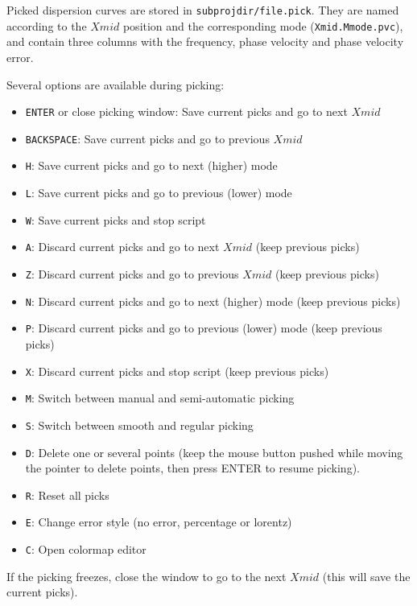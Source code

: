 \documentclass[twoside,a4paper]{article}
\begin{document}
Picked dispersion curves are stored in \verb|subprojdir/file.pick|. They are named according to the $Xmid$ position and the corresponding mode (\verb|Xmid.Mmode.pvc|), and contain three columns with the frequency, phase velocity and phase velocity error.

Several options are available during picking:
\begin{itemize}[leftmargin=*]
\item \verb|ENTER| or close picking window: Save current picks and go to next $Xmid$
\item \verb|BACKSPACE|: Save current picks and go to previous $Xmid$
\item \verb|H|: Save current picks and go to next (higher) mode
\item \verb|L|: Save current picks and go to previous (lower) mode
\item \verb|W|: Save current picks and stop script
\item \verb|A|: Discard current picks and go to next $Xmid$  (keep previous picks)
\item \verb|Z|: Discard current picks and go to previous $Xmid$ (keep previous picks)
\item \verb|N|: Discard current picks and go to next (higher) mode (keep previous picks)
\item \verb|P|: Discard current picks and go to previous (lower) mode (keep previous picks)
\item \verb|X|: Discard current picks and stop script (keep previous picks)
\item \verb|M|: Switch between manual and semi-automatic picking
\item \verb|S|: Switch between smooth and regular picking
\item \verb|D|: Delete one or several points (keep the mouse button pushed while moving the pointer to delete points, then press ENTER to resume picking).
\item \verb|R|: Reset all picks
\item \verb|E|: Change error style (no error, percentage or lorentz)
\item \verb|C|: Open colormap editor
\end{itemize}

If the picking freezes, close the window to go to the next $Xmid$ (this will save the current picks).
\end{document}
